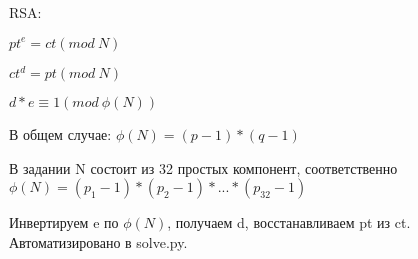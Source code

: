 \documentclass[12pt,a4paper]{scrartcl}
\begin{document}
    RSA: 
    
    $ pt ^ e = ct (mod\ N) $

    $ ct ^ d = pt (mod\ N) $

    $ d * e \equiv 1 (mod\ \phi(N))$ 

    В общем случае:
    $ \phi(N) = (p-1)*(q-1) $ 
    
    В задании N состоит из 32 простых компонент, соответственно $ \phi(N) = (p_1-1)*(p_2-1)*...*(p_{32}-1) $

    Инвертируем e по $\phi(N)$, получаем d, восстанавливаем pt из ct. Автоматизировано в solve.py.
\end{document}
